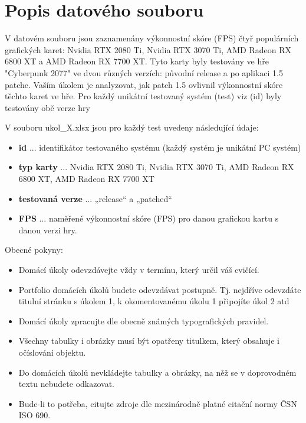 \section*{Popis datového souboru}
\label{sec:data-source-description}

V datovém souboru jsou zaznamenány výkonnostní skóre (FPS) čtyř populárních grafických karet:
Nvidia RTX 2080 Ti, Nvidia RTX 3070 Ti, AMD Radeon RX 6800 XT a AMD Radeon RX 7700 XT. Tyto karty
byly testovány ve hře "Cyberpunk 2077" ve dvou různých verzích: původní release a po aplikaci 1.5
patche. Vaším úkolem je analyzovat, jak patch 1.5 ovlivnil výkonnostní skóre těchto karet ve hře. Pro
každý unikátní testovaný systém (test) viz (id) byly testovány obě verze hry

\vspace{1em}
\noindent
V souboru ukol\_X.xlsx jsou pro každý test uvedeny následující údaje:

\begin{itemize}
  \item \textbf{id} ... identifikátor testovaného systému (každý systém je unikátní PC systém)
  \item \textbf{typ karty} ... Nvidia RTX 2080 Ti, Nvidia RTX 3070 Ti, AMD Radeon RX 6800 XT, AMD Radeon RX 7700 XT
  \item \textbf{testovaná verze} ... „release“ a „patched“
  \item \textbf{FPS} ... naměřené výkonnostní skóre (FPS) pro danou grafickou kartu s danou verzi hry.
\end{itemize}

\noindent
Obecné pokyny:

\begin{itemize}
    \item Domácí úkoly odevzdávejte vždy v termínu, který určil váš cvičící.
    \item Portfolio domácích úkolů budete odevzdávat postupně. Tj. nejdříve odevzdáte titulní stránku s úkolem 1, k okomentovanému úkolu 1 připojíte úkol 2 atd
    \item Domácí úkoly zpracujte dle obecně známých typografických pravidel. 
    \item Všechny tabulky i obrázky musí být opatřeny titulkem, který obsahuje i očíslování objektu.  
    \item Do domácích úkolů nevkládejte tabulky a obrázky, na něž se v doprovodném textu nebudete odkazovat.
    \item Bude-li to potřeba, citujte zdroje dle mezinárodně platné citační normy ČSN ISO 690.
\end{itemize}

\endinput